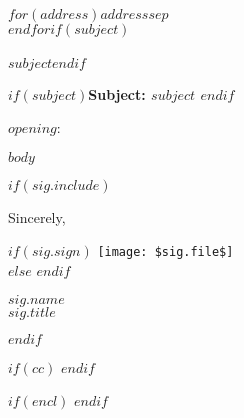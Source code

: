 \documentclass[$size$]{letter}
\begin{document}
\begin{letter}{$for(address)$$address$$sep$\\$endfor$$if(subject)$\\ ~ \\$subject$$endif$}

$if(subject)$\bf{Subject:} $subject$ $endif$

\opening{$opening$:}

$body$

$if(sig.include)$
\begin{minipage}[t]{6.5in}
Sincerely,\\

\vspace{0.1in}

$if(sig.sign)$
    \vspace{-0.2in}\texttt{[image: \$sig.file\$]}\\
$else$
    \vspace{0.2in}
$endif$

$sig.name$\\
$sig.title$
\end{minipage}
$endif$

$if(cc)$
\vspace{0.15in}
$endif$

$if(encl)$
$endif$

\end{letter}
\end{document}
